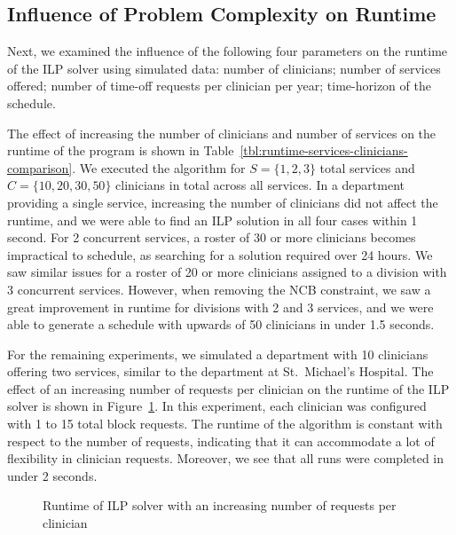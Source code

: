

\subsection{Influence of Problem Complexity on Runtime}
Next, we examined the influence of the following four parameters on the
runtime of the ILP solver using simulated data:
number of clinicians;
number of services offered;
number of time-off requests per clinician per year;
time-horizon of the schedule.

The effect of increasing the number of clinicians and number of services 
on the runtime of the program is shown in Table~\ref{tbl:runtime-services-clinicians-comparison}.
We executed the algorithm for
$S = \{1, 2, 3\}$ total services and $C = \{10, 20, 30, 50\}$ clinicians in  
total across all services. 
In a department providing a single service, increasing the number of clinicians
did not affect the runtime, and we were able to find an ILP solution in all four cases
within 1 second.
For 2 concurrent services, a roster of 30 or more
clinicians becomes impractical to schedule, as searching for a solution required
over 24 hours. We saw similar issues for a roster of 20 or more clinicians
assigned to a division with 3 concurrent services. However, when removing the
NCB constraint, we saw a great improvement in runtime for divisions with 2 and 3
services, and we were able to generate a schedule with upwards of 50 clinicians
in under 1.5 seconds.



For the remaining experiments, we simulated a department with 10 clinicians offering 
two services, similar to the department at St.\ Michael's Hospital. 
The effect of an increasing number of requests per clinician on the runtime of
the ILP solver is shown in Figure~\ref{fig:runtime-requests}.
In this experiment, each clinician was configured with 1 to 15 total block requests.
The runtime of the algorithm is constant with respect to the number of requests,
indicating that it can accommodate a lot of flexibility in
clinician requests. Moreover, we see that all runs were completed in under
2 seconds.

\begin{figure}[h]
	\centering
	\def\svgwidth{\columnwidth}
	\caption{Runtime of ILP solver with an increasing number of requests per clinician}
	
  \label{fig:runtime-requests}
\end{figure}

